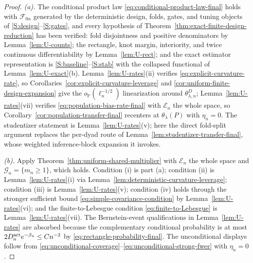 \documentclass[11pt]{article}
\theoremstyle{definition}
\newcommand{\1}{\mathbf 1}\newcommand{\op}{\operatorname}
\begin{document}
\begin{proof}
\emph{(a).}  The conditional product law
\eqref{eq:conditional-product-law-final} holds with
$\mathcal F_{0n}$ generated by the deterministic design, folds, gates, and
tuning objects of \ref{S:design}--\ref{S:gates}, and every hypothesis of
Theorem~\ref{thm:exact-finite-design-reduction} has been verified:
fold disjointness and positive denominators by Lemma~\ref{lem:U-counts};
the rectangle, knot margin, interiority, and twice continuous
differentiability by Lemma~\ref{lem:U-rect}; and the exact estimator
representation is \ref{S:baseline}--\ref{S:stab} with the collapsed functional
of Lemma~\ref{lem:U-exact}(b).  Lemma~\ref{lem:U-rates}(ii) verifies
\eqref{eq:explicit-curvature-rate}, so
Corollaries~\ref{cor:explicit-curvature-leverage} and
\ref{cor:uniform-finite-design-expansion} give the
$o_{\mathbb P}(\ell_n^{-1/2})$ linearization around $\theta^D_{\lambda,n}$;
Lemma~\ref{lem:U-rates}(vii) verifies
\eqref{eq:population-bias-rate-final} with $\mathcal E_n$ the whole space, so
Corollary~\ref{cor:population-transfer-final} recenters at
$\theta_\lambda(P)$ with $\eta_n=0$.  The studentizer statement is
Lemma~\ref{lem:U-rates}(v); here the direct fold-split argument replaces the
per-dyad route of Lemma~\ref{lem:studentizer-transfer-final}, whose weighted
inference-block expansion it invokes.

\emph{(b).}  Apply Theorem~\ref{thm:uniform-shared-multiplier} with
$\mathcal E_n$ the whole space and $\mathcal G_n=\{m_n\ge1\}$, which holds.
Condition (i) is part (a); condition (ii) is
Lemma~\ref{lem:U-rates}(i) via
Lemma~\ref{lem:deterministic-curvature-leverage}; condition (iii) is
Lemma~\ref{lem:U-rates}(v); condition (iv) holds through the stronger
sufficient bound \eqref{eq:simple-covariance-condition} by
Lemma~\ref{lem:U-rates}(vi); and the finite-to-Lebesgue condition
\eqref{eq:finite-to-Lebesgue} is Lemma~\ref{lem:U-rates}(vii).  The
Bernstein-event qualifications in Lemma~\ref{lem:U-rates} are absorbed because
the complementary conditional probability is at most
$2D_n^{\rm act}e^{-\beta_n}\le Cn^{-2}$ by
\eqref{eq:rectangle-probability-final}.  The unconditional displays follow
from \eqref{eq:unconditional-coverage}--\eqref{eq:unconditional-strong-fwer}
with $\eta_n=0$.


\end{proof}
\end{document}
